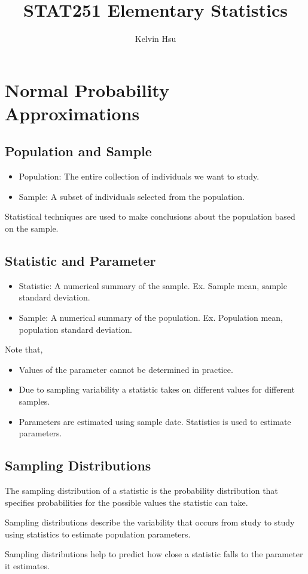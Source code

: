 \documentclass{article}
\title{STAT251 Elementary Statistics}
\author{Kelvin Hsu}
\begin{document}
    \sffamily
       \maketitle
       \newpage

    \section*{Normal Probability Approximations}
    \subsection*{Population and Sample}
    \begin{itemize}
        \item Population: The entire collection of individuals we want to study.
        \item Sample: A subset of individuals selected from the population.
    \end{itemize}

    Statistical techniques are used to make conclusions about the population 
    based on the sample.

    \subsection*{Statistic and Parameter}
    \begin{itemize}
        \item Statistic: A numerical summary of the sample. Ex. Sample mean, sample standard deviation.
        \item Sample: A numerical summary of the population. Ex. Population mean, population standard deviation.
    \end{itemize}

    Note that,
    \begin{itemize}
        \item Values of the parameter cannot be determined in practice.
        \item Due to sampling variability a statistic takes on different values for different samples.
        \item Parameters are estimated using sample date. Statistics is used to estimate parameters.
    \end{itemize}

    \subsection*{Sampling Distributions}
    The sampling distribution of a statistic is the probability distribution that specifies probabilities for the possible
    values the statistic can take.\par
    Sampling distributions describe the variability that occurs from study to study using statistics to estimate population parameters.\par
    Sampling distributions help to predict how close a statistic falls to the 
    parameter it estimates.
\end{document}

